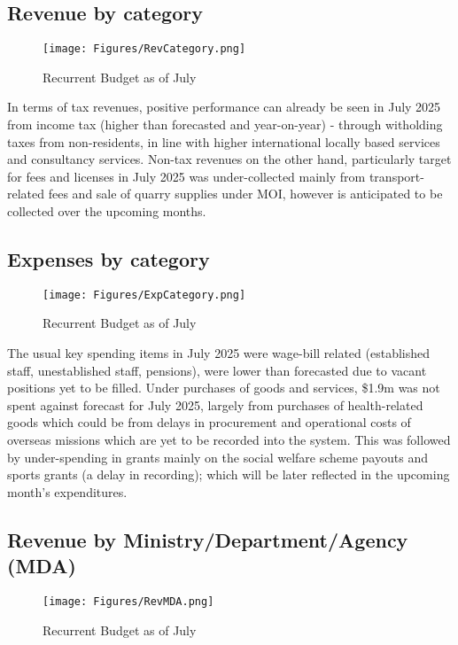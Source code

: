 \documentclass[11pt,a4paper]{setup}
\begin{document}
\newpage

\subsection*{Revenue by category}
\begin{figure}[H]
    		\centering
    		\texttt{[image: Figures/RevCategory.png]}
    		\caption{Recurrent Budget as of July}
    		\label{fig:figure}
    	\end{figure}


In terms of tax revenues, positive performance can already be seen in July 2025 from income tax (higher than forecasted and year-on-year) - through witholding taxes from non-residents, in line with higher international locally based services and consultancy services. 
Non-tax revenues on the other hand, particularly target for fees and licenses in July 2025 was under-collected mainly from transport-related fees and sale of quarry supplies under MOI, however is anticipated to be collected over the upcoming months.



\subsection*{Expenses by category}
\begin{figure}[H]
    		\centering
    		\texttt{[image: Figures/ExpCategory.png]}
    		\caption{Recurrent Budget as of July}
    		\label{fig:figure}
    	\end{figure}

The usual key spending items in July 2025 were wage-bill related (established staff, unestablished staff, pensions), were lower than forecasted due to vacant positions yet to be filled.
Under purchases of goods and services, \$1.9m was not spent against forecast for July 2025, largely from purchases of health-related goods which could be from delays in procurement and operational costs of overseas missions which are yet to be recorded into the system. This was followed by under-spending in grants mainly on the social welfare scheme payouts and sports grants (a delay in recording); which will be later reflected in the upcoming month's expenditures.

\newpage

\subsection*{Revenue by Ministry/Department/Agency (MDA)}
\begin{figure}[H]
    		\centering
    		\texttt{[image: Figures/RevMDA.png]}
    		\caption{Recurrent Budget as of July}
    		\label{fig:figure}
    	\end{figure}
\end{document}
